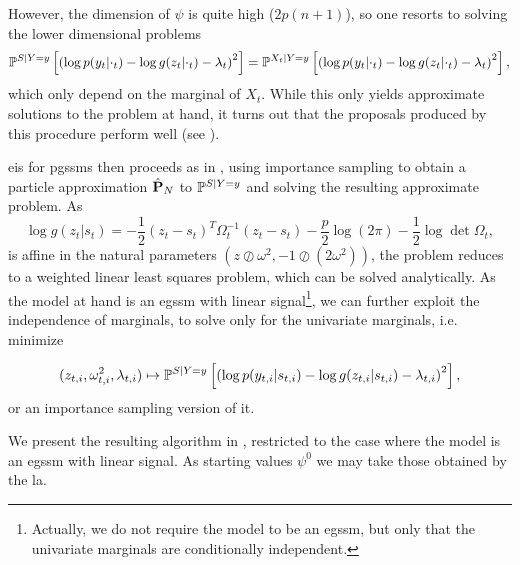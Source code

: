 However, the dimension of $\psi$ is quite high ($2p(n+1)$), so one resorts to solving the lower dimensional problems 
\begin{align}
    \label{eq:eis_marginals_problem}
    \Pps \left[ \left( \log p(y_{t}|\cdot_{t}) -  \log g(z_{t}|\cdot_{t}) - \lambda_{t} \right)^{2} \right] = \mathbb P^{X_{t}|Y=y} \left[ \left( \log p(y_{t}|\cdot_{t}) -  \log g(z_{t}|\cdot_{t}) - \lambda_{t} \right)^{2} \right],
\end{align}
which only depend on the marginal of $X_{t}$. While this only yields approximate solutions to the problem at hand, it turns out that the proposals produced by this procedure perform well (see ).

\gls{eis} for \glspl{pgssm} then proceeds as in , using importance sampling to obtain a particle approximation $\hat \P_{N}$ to $\Pps$ and solving the resulting approximate problem. As 
$$
    \log g(z_{t}|s_{t}) = - \frac{1}{2} (z_{t} - s_{t})^{T}\Omega_{t}^{-1}(z_{t} - s_{t})- \frac{p}{2}\log (2\pi) - \frac{1}{2} \log\det \Omega_{t},
$$
is affine in the natural parameters $\left( z \oslash \omega^{2}, -1 \oslash (2\omega^{2}) \right)$, the problem reduces to a weighted linear least squares problem, which can be solved analytically. As the model at hand is  an \gls{egssm} with linear signal\footnote{Actually, we do not require the model to be  an \gls{egssm}, but only that the univariate marginals are conditionally independent.}, we can further exploit the independence of marginals, to solve only for the univariate marginals, i.e. minimize

\begin{align}
    \label{eq:eis-marignals-target}
    (z_{t,i}, \omega^{2}_{t,i}, \lambda_{t,i}) \mapsto \Pps \left[ \left( \log p(y_{t,i}|s_{t,i}) - \log g(z_{t,i}|s_{t,i}) - \lambda_{t,i} \right)^{2} \right],
\end{align}
or an importance sampling version of it.

We present the resulting algorithm in , restricted to the case where the model is  an \gls{egssm} with linear signal. As starting values $\psi^{0}$ we may take those obtained by the \gls{la}. 

